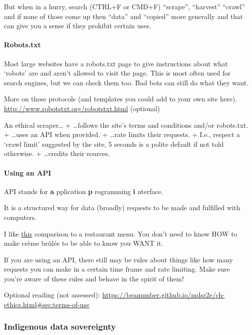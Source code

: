\documentclass[
  openany]{book}
\begin{document}
But when in a hurry, search (CTRL+F or CMD+F) ``scrape'', ``harvest'' ``crawl'' and if none of those come up then ``data'' and ``copied'' more generally and that can give you a sense if they prohibit certain uses.

\hypertarget{robots.txt}{%
\paragraph{Robots.txt}\label{robots.txt}}

Most large websites have a robots.txt page to give instructions about what `robots' are and aren't allowed to visit the page. This is most often used for search engines, but we can check them too. Bad bots can still do what they want.

More on these protocols (and templates you could add to your own site here).
\url{http://www.robotstxt.org/robotstxt.html} (optional)

An ethical scraper\ldots{}
+ \ldots follows the site's terms and conditions and/or robots.txt.
+ \ldots uses an API when provided.
+ \ldots rate limits their requests.
+ I.e., respect a `crawl limit' suggested by the site, 5 seconds is a polite default if not told otherwise.
+ \ldots credits their sources.

\hypertarget{using-an-api}{%
\paragraph{Using an API}\label{using-an-api}}

API stands for \textbf{a} pplication \textbf{p} rogramming \textbf{i} nterface.

It is a structured way for data (broadly) requests to be made and fulfilled with computers.

I like \href{https://www.howtogeek.com/343877/what-is-an-api/}{this} comparison to a restaurant menu. You don't need to know HOW to make crème brûlée to be able to know you WANT it.

If you are using an API, there still may be rules about things like how many requests you can make in a certain time frame and rate limiting. Make sure you're aware of these rules and behave in the spirit of them!

Optional reading (not assessed): \url{https://beanumber.github.io/mdsr2e/ch-ethics.html\#sec:terms-of-use}

\hypertarget{indigenous-data-sovereignty}{%
\subsubsection{Indigenous data sovereignty}\label{indigenous-data-sovereignty}}
\end{document}
